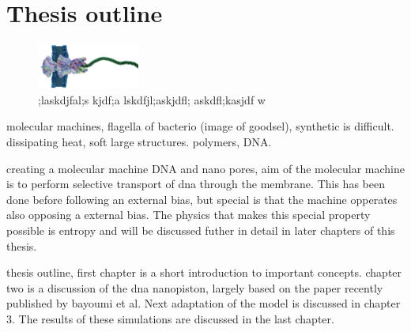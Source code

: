 \section{Thesis outline}

\begin{figure}
  \begin{center}
    \includegraphics[width=0.30\textwidth]{Figures/flagella.png}
  \end{center}
  \caption{;laskdjfal;s kjdf;a lskdfjl;askjdfl; askdfl;kasjdf w}
\end{figure}

molecular machines, flagella of bacterio (image of goodsel), synthetic is difficult.
dissipating heat, soft large structures.  polymers, DNA.

creating a molecular machine DNA and nano pores, aim of the molecular machine is to
perform selective transport of dna through the membrane. This has been done before
following an external bias, but special is that the machine opperates also opposing a
external bias. The physics that makes this special property possible is entropy and will
be discussed futher in detail in later chapters of this thesis.

thesis outline, first chapter is a short introduction to important concepts. chapter two
is a discussion of the dna nanopiston, largely based on the paper recently published by
bayoumi et al. Next adaptation of the model is discussed in chapter 3. The results of
these simulations are discussed in the last chapter.

